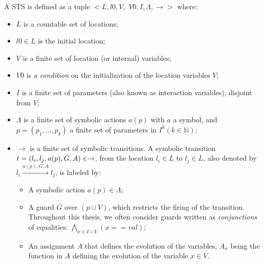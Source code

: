 \begin{definition}
    A STS is defined as a tuple $<L,l0,V,$
    $V0,I,\Lambda,\rightarrow>$ where:

    \begin{itemize}
        \item $L$ is a countable set of locations;

        \item $l0 \in L$ is the initial location;

        \item $V$ is a finite set of location (or internal)
            variables;

        \item $V0$ is \emph{a condition} on the initialization of
            the location variables $V$;

        \item $I$ is a finite set of parameters (also known as
            interaction variables), disjoint from $V$;

        \item $\Lambda$ is a finite set of symbolic actions
            $a(p)$ with $a$ a symbol, and $p=(p_1,\dots ,p_k)$ a
            finite set of parameters in $I^{k} (k \in
            \mathbb{N})$;

        \item $\rightarrow$ is a finite set of symbolic
            transitions. A symbolic transition $t =
            (l_i,l_j,a(p),G,\\A) \in \rightarrow$, from the
            location $l_i \in L$ to $l_j \in L$, also denoted by
            $l_i \xrightarrow{a(p),G,A} l_j$, is labeled by:

		\begin{itemize}
            \item A symbolic action $a(p) \in \Lambda$;

            \item A guard $G$ over $(p \cup V)$, which
            restricts the firing of the transition. Throughout
            this thesis, we often consider guards written as
            \emph{conjunctions} of equalities: $\displaystyle
            \bigwedge_{x \in I \cup V} (x == val)$;

            \item An assignment $A$ that defines the evolution
            of the variables, $A_x$ being the function in
            $A$ defining the evolution of the variable $x \in V$.
		\end{itemize}
	\end{itemize}

	\label{def:sts}
\end{definition}

